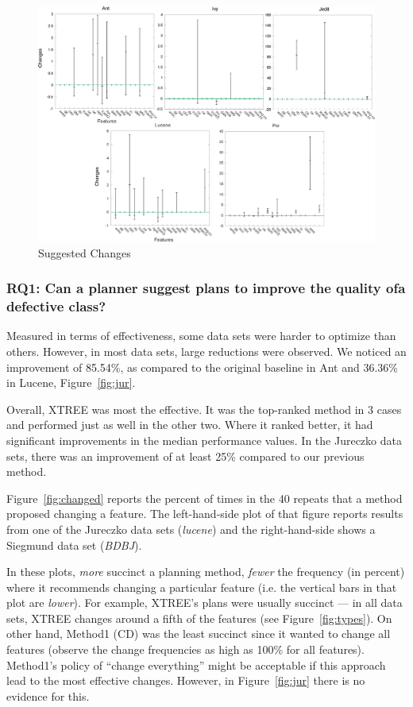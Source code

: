 \documentclass{sig-alternate}
\newcommand{\fig}[1]{Figure~\ref{fig:#1}}
\begin{document}
{\begin{itemize}[leftmargin=3mm]
\begin{figure}[!y]
\centering
\includegraphics[width=0.90\linewidth]{figs/changes0.png}
\caption{Suggested Changes}
\label{figs:changes}
\end{figure}

\subsubsection{RQ1: Can a planner suggest plans to improve the quality ofa defective class?}

Measured in terms of effectiveness, some data sets were harder to optimize than others. However, in most data sets, large reductions were observed. We noticed an improvement of 85.54\%, as compared to the original baseline in Ant and 36.36\% in Lucene, \fig{jur}.

Overall, XTREE was most the effective. It was the top-ranked method in 3 cases and performed just as well in the other two. Where it ranked better, it had significant improvements in the median performance values. In the Jureczko data sets, there was an improvement of at least 25\% compared to our previous method.

\fig{changed} reports the percent of times in the 40 repeats that a method proposed changing a feature. The left-hand-side plot of that figure reports results from one of the Jureczko data sets ({\em lucene}) and the right-hand-side shows a Siegmund data set ({\em BDBJ}). 

In these plots, {\em more} succinct a planning method, {\em fewer} the frequency (in percent) where it recommends changing a particular feature (i.e. the vertical bars in that plot are {\em lower}). For example, XTREE's plans were usually succinct --- in all  data sets, XTREE   changes around a fifth of the features (see \fig{types}). On other hand,  Method1 (CD) was the least succinct  since it  wanted to change all features (observe the change frequencies as high as 100\% for all features). Method1's policy of ``change everything''  might be acceptable if this approach lead to the most effective changes. However, in \fig{jur} there is no evidence for this.  
 


\end{itemize}}
\end{document}

